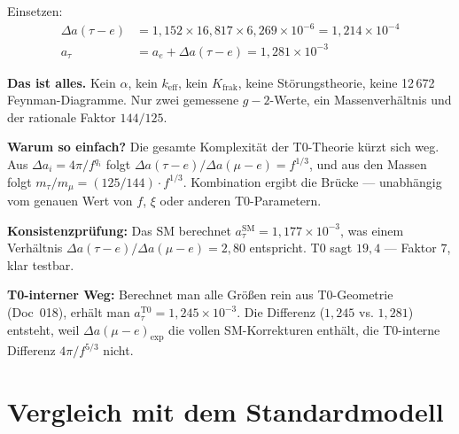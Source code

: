 Einsetzen:
\begin{align}
	\Delta a(\tau{-}e) &= 1{,}152 \times 16{,}817 \times 6{,}269 \times 10^{-6} = 1{,}214 \times 10^{-4} \\
	a_\tau &= a_e + \Delta a(\tau{-}e) = \boxed{1{,}281 \times 10^{-3}}
	\label{eq:taupred}
\end{align}

\textbf{Das ist alles.} Kein $\alpha$, kein $k_\text{eff}$, kein $K_\text{frak}$, keine Störungstheorie, keine 12\,672 Feynman-Diagramme. Nur zwei gemessene $g-2$-Werte, ein Massenverhältnis und der rationale Faktor $144/125$.

\textbf{Warum so einfach?} Die gesamte Komplexität der T0-Theorie kürzt sich weg. Aus $\Delta a_i = 4\pi/f^{q_i}$ folgt $\Delta a(\tau{-}e)/\Delta a(\mu{-}e) = f^{1/3}$, und aus den Massen folgt $m_\tau/m_\mu = (125/144) \cdot f^{1/3}$. Kombination ergibt die Brücke — unabhängig vom genauen Wert von $f$, $\xi$ oder anderen T0-Parametern.

\textbf{Konsistenzprüfung:} Das SM berechnet $a_\tau^\text{SM} = 1{,}177 \times 10^{-3}$, was einem Verhältnis $\Delta a(\tau{-}e)/\Delta a(\mu{-}e) = 2{,}80$ entspricht. T0 sagt $19{,}4$ — Faktor $7$, klar testbar.

\textbf{T0-interner Weg:} Berechnet man alle Größen rein aus T0-Geometrie (Doc~018), erhält man $a_\tau^\text{T0} = 1{,}245 \times 10^{-3}$. Die Differenz ($1{,}245$ vs. $1{,}281$) entsteht, weil $\Delta a(\mu{-}e)_\text{exp}$ die vollen SM-Korrekturen enthält, die T0-interne Differenz $4\pi/f^{5/3}$ nicht.

\begin{table}[h]
	\centering
	\caption{Tau-Vorhersagen: T0 vs. SM}
	\label{tab:taupred}
\end{table}

\section{Vergleich mit dem Standardmodell}
\label{sec:comparison}

